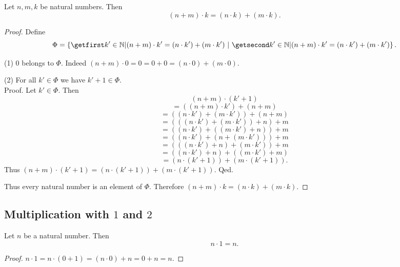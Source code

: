 \documentclass[../arithmetic.tex]{subfiles}
\begin{document}
  \begin{forthel}
    \begin{proposition}
      Let $n, m, k$ be natural numbers.
      Then \[ (n + m) \cdot k = (n \cdot k) + (m \cdot k). \]
    \end{proposition}
    \begin{proof}
      Define \[ \Phi = \class{k' \in \Nat | (n + m) \cdot k' =
      (n \cdot k') + (m \cdot k')}. \]

      (1) $0$ belongs to $\Phi$.
      Indeed $(n + m) \cdot 0
        = 0
        = 0 + 0
        = (n \cdot 0) + (m \cdot 0)$.

      (2) For all $k' \in \Phi$ we have $k' + 1 \in \Phi$. \\
      Proof.
        Let $k' \in \Phi$.
        Then
        \[  (n + m) \cdot (k' + 1)                        \]
        \[    = ((n + m) \cdot k') + (n + m)              \]
        \[    = ((n \cdot k') + (m \cdot k')) + (n + m)   \]
        \[    = (((n \cdot k') + (m \cdot k')) + n) + m   \]
        \[    = ((n \cdot k') + ((m \cdot k') + n)) + m   \]
        \[    = ((n \cdot k') + (n + (m \cdot k'))) + m   \]
        \[    = (((n \cdot k') + n) + (m \cdot k')) + m   \]
        \[    = ((n \cdot k') + n) + ((m \cdot k') + m)   \]
        \[    = (n \cdot (k' + 1)) + (m \cdot (k' + 1)).  \]
        Thus $(n + m) \cdot (k' + 1) = (n \cdot (k' + 1)) + (m \cdot (k' + 1))$.
      Qed.

      Thus every natural number is an element of $\Phi$.
      Therefore $(n + m) \cdot k = (n \cdot k) + (m \cdot k)$.
    \end{proof}
  \end{forthel}


  \subsection*{Multiplication with $1$ and $2$}

  \begin{forthel}
    \begin{proposition}
      Let $n$ be a natural number.
      Then \[ n \cdot 1 = n. \]
    \end{proposition}
    \begin{proof}
      $n \cdot 1
        = n \cdot (0 + 1)
        = (n \cdot 0) + n
        = 0 + n
        = n$.
    \end{proof}
  \end{forthel}
\end{document}
